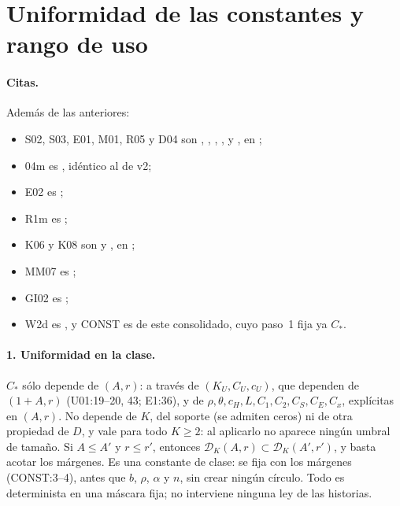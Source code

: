 \section{Uniformidad de las constantes y rango de uso}\label{sec:usos}
\paragraph{Citas.} Además de las anteriores:
\begingroup\sloppy
\begin{itemize}
\item S02, S03, E01, M01, R05 y D04 son , ,
, ,  y
, en ;
\item 04m es , idéntico al de v2;
\item E02 es ;
\item R1m es ;
\item K06 y K08 son  y , en
;
\item MM07 es ;
\item GI02 es ;
\item W2d es , y CONST es  de este consolidado,
cuyo paso~1 fija ya $C_*$.
\end{itemize}
\endgroup

\paragraph{1. Uniformidad en la clase.} $C_*$ sólo depende de $(A,r)$: a través de $(K_U,C_U,c_U)$,
que dependen de $(1+A,r)$ (U01:19--20, 43; E1:36), y de $\rho,\theta,c_H,L,C_1,C_2,C_S,C_E,C_x$,
explícitas en $(A,r)$. No depende de $K$, del soporte (se admiten ceros) ni de otra propiedad de
$D$, y vale para todo $K\ge2$: al aplicarlo no aparece ningún umbral de tamaño. Si $A\le A'$ y
$r\le r'$, entonces $\mathcal D_K(A,r)\subset\mathcal D_K(A',r')$, y basta acotar los márgenes.
Es una constante de clase: se fija con los márgenes (CONST:3--4), antes que $b$, $\rho$,
$\alpha$ y $n$, sin crear ningún círculo. Todo es determinista en una máscara fija; no interviene
ninguna ley de las historias.

